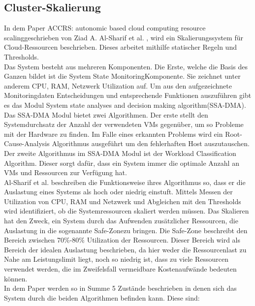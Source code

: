 \documentclass[a4paper,10pt]{scrartcl}
\begin{document}
\subsection{Cluster-Skalierung}

In dem Paper \glqq ACCRS: autonomic based cloud computing resource scaling\grqq geschrieben von Ziad A. Al-Sharif et al. \cite{AlSharif.2016} , wird ein Skalierungssystem für Cloud-Ressourcen beschrieben. Dieses arbeitet mithilfe statischer Regeln und Thresholds.\\
Das System besteht aus mehreren Komponenten. Die Erste, welche die Basis des Ganzen bildet ist die \glqq System State Monitoring\grqq Komponente. Sie zeichnet unter anderem CPU, RAM, Netzwerk Utilization auf. Um aus den aufgezeichnete Monitoringdaten Entscheidungen und entsprechende Funktionen auszuführen gibt es das Modul \glqq System state analyses and decision making algorithm\grqq(SSA-DMA). Das SSA-DMA Modul bietet zwei Algorithmen. Der erste stellt den Systemdurchsatz der Anzahl der verwendeten VMs gegenüber, um so Probleme mit der Hardware zu finden. Im Falle eines erkannten Problems wird ein Root-Cause-Analysis Algorithmus ausgeführt um den fehlerhaften Host auszutauschen.\\
Der zweite Algorithmus im SSA-DMA Modul ist der \glqq Workload Classification Algorithm\grqq.
Dieser sorgt dafür, dass ein System immer die optimale Anzahl an VMs und Ressourcen zur Verfügung hat.\\
Al-Sharif et al.  beschreiben die Funktionsweise ihres Algorithmus so, dass er die Auslastung eines Systems als hoch oder niedrig einstuft. Mittels Messen der Utilization von CPU, RAM und Netzwerk und Abgleichen mit den Thresholds wird identifiziert, ob die Systemressourcen skaliert werden müssen. Das Skalieren hat den Zweck, ein System durch das Aufwenden zusätzlicher Ressourcen, die Auslastung in die sogenannte \glqq Safe-Zone\grqq zu bringen. Die Safe-Zone beschreibt den Bereich zwischen 70\%-80\% Utilization der Ressourcen. Dieser Bereich wird als Bereich der idealen Auslastung beschrieben, da hier weder die Ressourcenlast zu Nahe am Leistungslimit liegt, noch so niedrig ist, dass zu viele Ressourcen verwendet werden, die im Zweifelsfall vermeidbare Kostenaufwände bedeuten können.\\
In dem Paper werden so in Summe 5 Zustände beschrieben in denen sich das System durch die beiden Algorithmen befinden kann. Diese sind:
\end{document}
